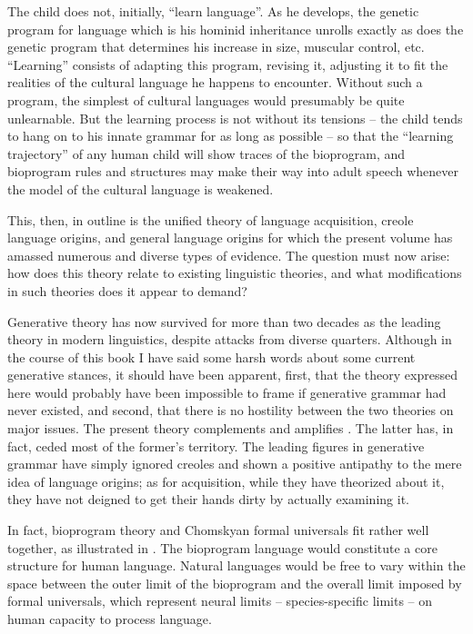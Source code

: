 The child does not, initially, ``learn language''. As he develops, the genetic program for language which is his hominid inheritance unrolls exactly as does the genetic program that determines his increase
in size, muscular control, etc. ``Learning'' consists of adapting this program, revising it, adjusting it to fit the realities of the cultural language he happens to encounter. Without such a program, the simplest of cultural languages would presumably be quite unlearnable. But the learning process is not without its tensions -- the child tends to hang on to his innate grammar for as long as possible -- so that the ``learning trajectory'' of any human child will show traces of the bioprogram, and bioprogram rules and structures may make their way into adult speech whenever the model of the cultural language is weakened.

This, then, in outline is the unified theory of language acquisition, creole language origins, and general language origins for which the present volume has amassed numerous and diverse types of evidence. The question must now arise: how does this theory relate to existing linguistic theories, and what modifications in such theories does it appear to demand?

Generative theory has now survived for more than two decades as the leading theory in modern linguistics, despite attacks from diverse quarters. Although in the course of this book I have said some harsh words about some current generative stances, it should have been apparent, first, that the theory expressed here would probably have been impossible to frame if generative grammar had never existed, and second, that there is no hostility between the two theories on major issues. The present theory complements and amplifies . The latter has, in fact, ceded most of the former's territory. The leading figures in generative grammar have simply ignored creoles and shown a positive antipathy to the mere idea of language origins; as for acquisition, while they have theorized about it, they have not deigned to get their hands dirty by actually examining it.

In fact, bioprogram theory and Chomskyan formal universals fit rather well together, as illustrated in . %
The bioprogram language would constitute a core structure for human language. Natural languages would be free to vary within the space between the outer limit of the bioprogram and the overall limit
imposed by formal universals, which represent neural limits -- species-specific limits -- on human capacity to process language.

